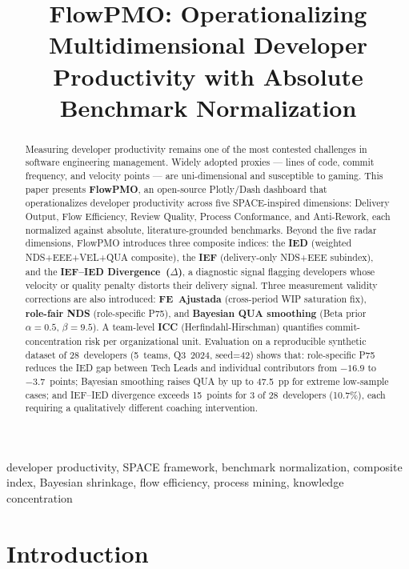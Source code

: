 \documentclass[conference]{IEEEtran}
\title{FlowPMO: Operationalizing Multidimensional Developer\\
       Productivity with Absolute Benchmark Normalization}
\author{
  \IEEEauthorblockN{Rodrigo Almeida de Oliveira}
  \IEEEauthorblockA{Flow Engineering Research Group\\
  \texttt{rodrigoalmeidadeoliveira@gmail.com}}
}
\begin{document}
\maketitle

\begin{abstract}
Measuring developer productivity remains one of the most contested challenges in
software engineering management. Widely adopted proxies --- lines of code, commit
frequency, and velocity points --- are uni-dimensional and susceptible to gaming.
This paper presents \textbf{FlowPMO}, an open-source Plotly/Dash dashboard that
operationalizes developer productivity across five SPACE-inspired dimensions:
Delivery Output, Flow Efficiency, Review Quality, Process Conformance, and
Anti-Rework, each normalized against absolute, literature-grounded benchmarks.
Beyond the five radar dimensions, FlowPMO introduces three composite indices:
the \textbf{IED} (weighted NDS+EEE+VEL+QUA composite), the \textbf{IEF}
(delivery-only NDS+EEE subindex), and the \textbf{IEF--IED Divergence~($\Delta$)},
a diagnostic signal flagging developers whose velocity or quality penalty distorts
their delivery signal.
Three measurement validity corrections are also introduced: \textbf{FE~Ajustada}
(cross-period WIP saturation fix), \textbf{role-fair NDS} (role-specific P75),
and \textbf{Bayesian QUA smoothing} (Beta prior $\alpha=0.5$, $\beta=9.5$).
A team-level \textbf{ICC} (Herfindahl-Hirschman) quantifies commit-concentration
risk per organizational unit.
Evaluation on a reproducible synthetic dataset of 28~developers (5~teams, Q3~2024,
seed=42) shows that: role-specific P75 reduces the IED gap between Tech Leads and
individual contributors from $-16.9$ to $-3.7$~points; Bayesian smoothing raises
QUA by up to 47.5~pp for extreme low-sample cases; and IEF--IED divergence
exceeds 15~points for 3 of 28~developers (10.7\%), each requiring a qualitatively
different coaching intervention.
\end{abstract}

\begin{IEEEkeywords}
developer productivity, SPACE framework, benchmark normalization, composite index,
Bayesian shrinkage, flow efficiency, process mining, knowledge concentration
\end{IEEEkeywords}

\section{Introduction}
\label{sec:intro}
\end{document}
